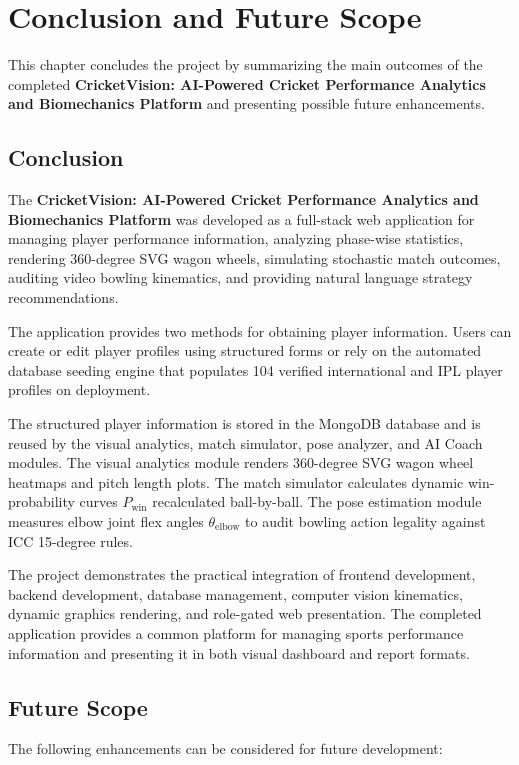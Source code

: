 \chapter{Conclusion and Future Scope}

This chapter concludes the project by summarizing the main outcomes of the completed \textbf{CricketVision: AI-Powered Cricket Performance Analytics and Biomechanics Platform} and presenting possible future enhancements.

\section{Conclusion}
The \textbf{CricketVision: AI-Powered Cricket Performance Analytics and Biomechanics Platform} was developed as a full-stack web application for managing player performance information, analyzing phase-wise statistics, rendering 360-degree SVG wagon wheels, simulating stochastic match outcomes, auditing video bowling kinematics, and providing natural language strategy recommendations.

The application provides two methods for obtaining player information. Users can create or edit player profiles using structured forms or rely on the automated database seeding engine that populates 104 verified international and IPL player profiles on deployment.

The structured player information is stored in the MongoDB database and is reused by the visual analytics, match simulator, pose analyzer, and AI Coach modules. The visual analytics module renders 360-degree SVG wagon wheel heatmaps and pitch length plots. The match simulator calculates dynamic win-probability curves $P_{\text{win}}$ recalculated ball-by-ball. The pose estimation module measures elbow joint flex angles $\theta_{\text{elbow}}$ to audit bowling action legality against ICC 15-degree rules.

The project demonstrates the practical integration of frontend development, backend development, database management, computer vision kinematics, dynamic graphics rendering, and role-gated web presentation. The completed application provides a common platform for managing sports performance information and presenting it in both visual dashboard and report formats.

\section{Future Scope}
The following enhancements can be considered for future development:

